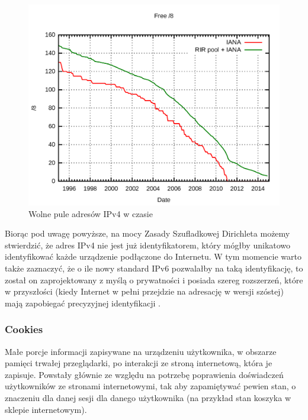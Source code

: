 \begin{figure}
	\includegraphics[width=\textwidth,keepaspectratio]{img/01}
	\caption{Wolne pule adresów IPv4 w czasie}
\end{figure}

Biorąc pod uwagę powyższe, na mocy Zasady Szufladkowej Dirichleta możemy
stwierdzić, że adres IPv4 nie jest już identyfikatorem, który mógłby unikatowo
identyfikować każde urządzenie podłączone do Internetu. W tym momencie warto
także zaznaczyć, że o ile nowy standard IPv6 pozwalałby na taką identyfikację,
to został on zaprojektowany z myślą o prywatności i posiada szereg rozszerzeń,
które w przyszłości (kiedy Internet w pełni przejdzie na adresację w wersji
szóstej) mają zapobiegać precyzyjnej identyfikacji \cite{narten2001privacy}.

\subsubsection{Cookies}
Małe porcje informacji zapisywane na urządzeniu użytkownika, w obszarze pamięci
trwałej przeglądarki, po interakcji ze stroną internetową, która je zapisuje.
Powstały głównie ze względu na potrzebę poprawienia doświadczeń użytkowników ze
stronami internetowymi, tak aby zapamiętywać pewien stan, o znaczeniu dla danej
sesji dla danego użytkownika (na przykład stan koszyka w sklepie internetowym).

